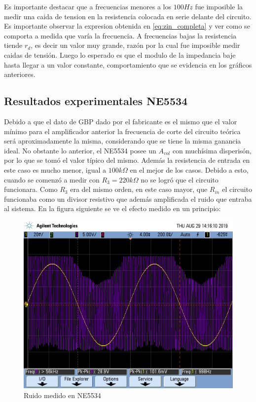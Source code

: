 
Es importante destacar que a frecuencias menores a los $100 Hz$ fue imposible la medir una caida de tension en la resistencia colocada en serie delante del circuito. Es importante observar la expresion obtenida en \ref{eq:zin_completa} y ver como se comporta a medida que varía la frecuencia. A frecuencias bajas la resistencia tiende $r_d$, es decir un valor muy grande, razón por la cual fue imposible medir caidas de tensión. Luego lo esperado es que el modulo de la impedancia baje hasta llegar a un valor constante, comportamiento que se evidencia en los gráficos anteriores.  


\subsection{Resultados experimentales NE5534}

Debido a que el dato de GBP dado por el fabricante es el mismo que el valor mínimo para el amplificador anterior la frecuencia de corte del circuito teórica será aproximadamente la misma, considerando que se tiene la misma ganancia ideal. No obstante lo anterior, el NE5534 posee un $A_{vol}$ con muchísima disperisón, por lo que se tomó el valor típico del mismo. Además la resistencia de entrada en este caso es mucho menor, igual a $100k\Omega$ en el mejor de los casos. Debido a esto, cuando se comenzó a medir con $R_3 = 220k\Omega$ no se logró que el circuito funcionara. Como $R_3$ era del mismo orden, en este caso mayor, que $R_{in}$ el circuito funcionaba como un divisor resistivo que además amplificada el ruido que entraba al sistema. En la figura siguiente se ve el efecto medido en un principio:


\begin{figure}[H]	
	\centering
	\includegraphics[width=\textwidth]{Ejercicio2/Imagenes/ruido.png}
	\caption{Ruido medido en NE5534}
	\label{fig:ruido}
\end{figure}

